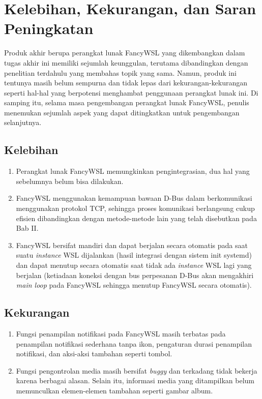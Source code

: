 \section{Kelebihan, Kekurangan, dan Saran Peningkatan}

Produk akhir berupa perangkat lunak FancyWSL yang dikembangkan dalam tugas akhir ini memiliki sejumlah keunggulan, terutama dibandingkan dengan penelitian terdahulu yang membahas topik yang sama. Namun, produk ini tentunya masih belum sempurna dan tidak lepas dari kekurangan-kekurangan seperti hal-hal yang berpotensi menghambat penggunaan perangkat lunak ini. Di samping itu, selama masa pengembangan perangkat lunak FancyWSL, penulis menemukan sejumlah aspek yang dapat ditingkatkan untuk pengembangan selanjutnya.

\subsection{Kelebihan}

\begin{enumerate}
    \item Perangkat lunak FancyWSL memungkinkan pengintegrasian, dua hal yang sebelumnya belum bisa dilakukan.
    \item FancyWSL menggunakan kemampuan bawaan D-Bus dalam berkomunikasi menggunakan protokol TCP, sehingga proses komunikasi berlangsung cukup efisien dibandingkan dengan metode-metode lain yang telah disebutkan pada Bab II.
    \item FancyWSL bersifat mandiri dan dapat berjalan secara otomatis pada saat suatu \textit{instance} WSL dijalankan (hasil integrasi dengan sistem init systemd) dan dapat menutup secara otomatis saat tidak ada \textit{instance} WSL lagi yang berjalan (ketiadaan koneksi dengan bus perpesanan D-Bus akan mengakhiri \textit{main loop} pada FancyWSL sehingga menutup FancyWSL secara otomatis).
\end{enumerate}

\subsection{Kekurangan}

\begin{enumerate}
    \item Fungsi penampilan notifikasi pada FancyWSL masih terbatas pada penampilan notifikasi sederhana tanpa ikon, pengaturan durasi penampilan notifikasi, dan aksi-aksi tambahan seperti tombol.

    \item Fungsi pengontrolan media masih bersifat \textit{buggy} dan terkadang tidak bekerja karena berbagai alasan. Selain itu, informasi media yang ditampilkan belum memunculkan elemen-elemen tambahan seperti gambar album.
\end{enumerate}

